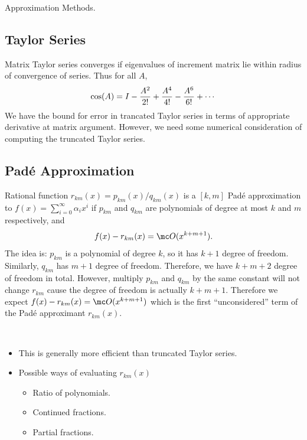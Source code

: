 \documentclass{article}
\begin{document}
\begin{mybox}
    {} Approximation Methods.
\end{mybox}

\subsection{Taylor Series}
Matrix Taylor series converges if eigenvalues of increment matrix lie
within radius of convergence of series. Thus for all $A$,
\begin{equation}\notag
    \cos(A) = I - \frac{A^2}{2!} + \frac{A^4}{4!} - \frac{A^6}{6!} + \cdots
\end{equation}
We have the bound for error in trancated Taylor series in terms of
appropriate derivative at matrix argument. However, we need some
numerical consideration of computing the truncated Taylor series.

\subsection{Pad\'e Approximation}

Rational function $r_{km}(x) = p_{km}(x)/q_{km}(x)$ is a $[k,m]$ Pad\'e
approximation to $f(x) = \sum_{i=0}^\infty \alpha_i x^i$ if $p_{km}$ and
$q_{km}$ are polynomials of degree at most $k$ and $m$ respectively, and 
\begin{equation}\notag
    f(x) - r_{km}(x) = \mc O(x^{k+m+1}).
\end{equation}
The idea is: $p_{km}$ is a polynomial of degree $k$, so it has $k+1$
degree of freedom. Similarly, $q_{km}$ has $m+1$ degree of freedom.
Therefore, we have $k+m+2$ degree of freedom in total. However, multiply
$p_{km}$ and $q_{km}$ by the same constant will not change $r_{km}$
cause the degree of freedom is actually $k+m+1$. Therefore we expect
$f(x) - r_{km}(x) = \mc O(x^{k+m+1})$ which is the first
``unconsidered'' term of the Pad\'e approximant $r_{km}(x)$.

\begin{remark}
    \ 
    \begin{itemize}
        \item This is generally more efficient than truncated Taylor
        series.
        \item Possible ways of evaluating $r_{km}(x)$
        \begin{itemize}
            \item Ratio of polynomials.
            \item Continued fractions.
            \item Partial fractions.
        \end{itemize}
    \end{itemize}
\end{remark}
\end{document}
